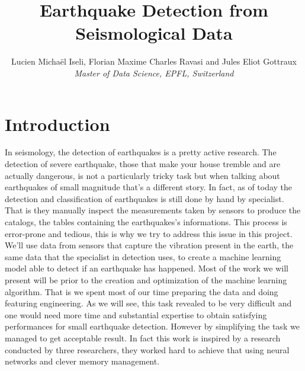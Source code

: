 \documentclass[10pt,conference,compsocconf]{IEEEtran}
\begin{document}
\title{Earthquake Detection from Seismological Data}

\author{
  Lucien Michaël Iseli, Florian Maxime Charles Ravasi and Jules Eliot Gottraux\\
  \textit{Master of Data Science, EPFL, Switzerland}
}

\maketitle
\section{Introduction}
In seismology, the detection of earthquakes is a pretty active research. The detection of severe earthquake, those that make your house tremble and are actually dangerous, is not a particularly tricky task but when talking about earthquakes of small magnitude that's a different story. In fact, as of today the detection and classification of earthquakes is still done by hand by specialist. That is they manually inspect the measurements taken by sensors to produce the catalogs, the tables containing the earthquakes's informations. This process is error-prone and tedious, this is why we try to address this issue in this project. We'll use data from sensors that capture the vibration present in the earth, the same data that the specialist in detection uses, to create a machine learning model able to detect if an earthquake has happened. Most of the work we will present will be prior to the creation and optimization of the machine learning algorithm. That is we spent most of our time preparing the data and doing featuring engineering. As we will see, this task revealed to be very difficult and one would need more time and substantial expertise to obtain satisfying performances for small earthquake detection. However by simplifying the task we managed to get acceptable result. In fact this work is inspired by a research \cite{ConvNetPaper} conducted by three researchers, they worked hard to achieve that using neural networks and clever memory management.
\end{document}
